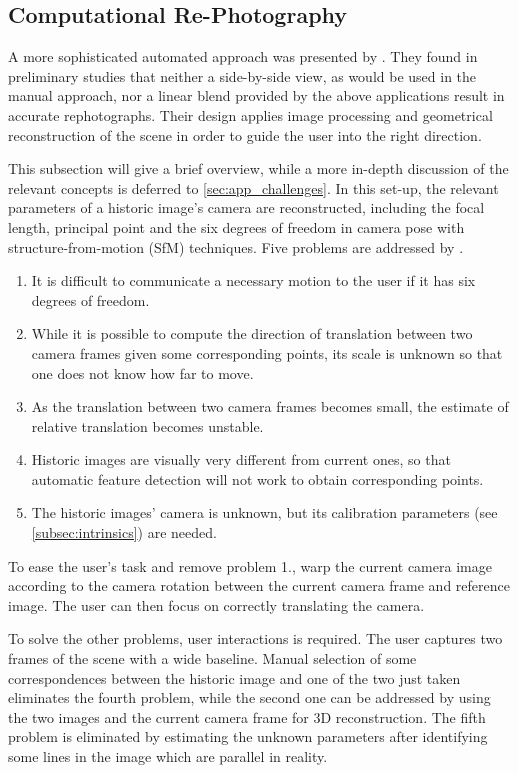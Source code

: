 \subsection{Computational Re-Photography}

A more sophisticated automated approach was presented by \citet{bae2010}. They
found in preliminary studies that neither a side-by-side view, as would be used
in the manual approach, nor a linear blend provided by the above applications
result in accurate rephotographs. Their design applies image processing and
geometrical reconstruction of the scene in order to guide the user into the right direction.

This
subsection will give a brief overview, while a more in-depth discussion of the
relevant concepts is deferred to \autoref{sec:app_challenges}. 
In this set-up, the relevant parameters of a historic image's camera are
reconstructed, including the focal length, principal point and the six degrees
of freedom in camera pose with structure-from-motion (SfM) techniques. Five problems
are addressed by \citet{bae2010}.

\begin{enumerate}
   \item It is difficult to communicate a necessary motion to the user if it has
      six degrees of freedom.
   \item While it is possible to compute the direction of translation between
      two camera frames given some corresponding points, its scale is unknown so
      that one does not know how far to move.
   \item As the translation between two camera frames becomes small, the
      estimate of relative translation becomes unstable.
   \item Historic images are visually very different from current ones, so that
      automatic feature detection will not work to obtain corresponding points.
   \item The historic images' camera is unknown, but its calibration parameters
      (see \autoref{subsec:intrinsics}) are needed.
\end{enumerate}

To ease the user's task and remove problem 1., \citet{bae2010} warp the current camera image
according to the camera rotation between the current camera frame and reference image.  The
user can then focus on correctly translating the camera. 

To solve the other problems, user interactions is required. The user captures
two frames of the scene with a wide baseline. Manual selection of some
correspondences between the historic image and one of the two just taken
eliminates the fourth problem, while the second one can be addressed by using
the two images and the current camera frame for 3D reconstruction. The fifth
problem is eliminated by estimating the unknown parameters after 
identifying some lines in the image which are parallel in reality.

